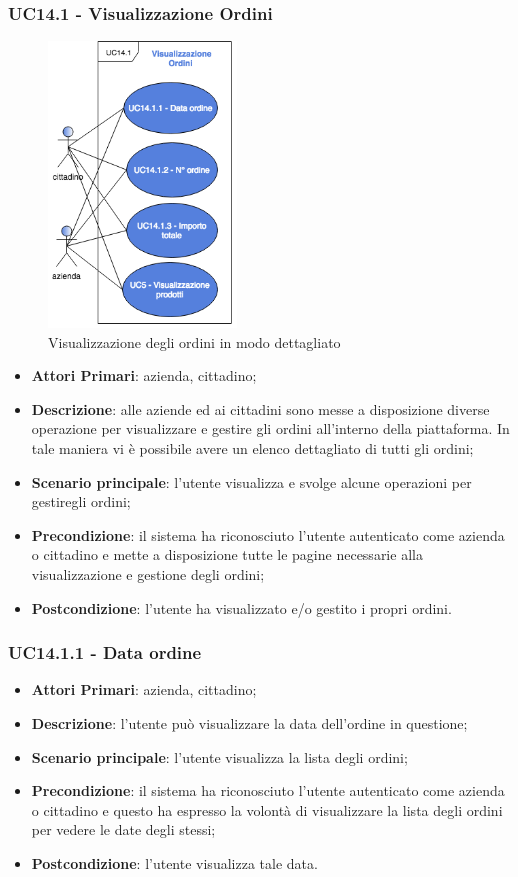 \subsubsection{UC14.1 - Visualizzazione Ordini}
\begin{figure}[H]
	\includegraphics[width=5cm]{res/images/UC14-1VisualOrdini.png}
	\centering
	\caption{Visualizzazione degli ordini in modo dettagliato}
\end{figure}
\begin{itemize}
	\item \textbf{Attori Primari}: azienda, cittadino;
	\item \textbf{Descrizione}: alle aziende ed ai cittadini sono messe a disposizione diverse operazione per visualizzare e gestire gli ordini all'interno della piattaforma. In tale maniera vi è possibile avere un elenco dettagliato di tutti gli ordini;
	\item \textbf{Scenario principale}: l'utente visualizza e svolge alcune operazioni per gestiregli ordini;
	\item \textbf{Precondizione}: il sistema ha riconosciuto l'utente autenticato come azienda o cittadino e mette a disposizione tutte le pagine necessarie alla visualizzazione e gestione degli ordini;
	\item \textbf{Postcondizione}: l'utente ha visualizzato e/o gestito i propri ordini.
\end{itemize} 

\subsubsection{UC14.1.1 - Data ordine}
\begin{itemize}
	\item \textbf{Attori Primari}: azienda, cittadino;
	\item \textbf{Descrizione}: l'utente può visualizzare la data dell'ordine in questione;
	\item \textbf{Scenario principale}: l'utente visualizza la lista degli ordini;
	\item \textbf{Precondizione}: il sistema ha riconosciuto l'utente autenticato come azienda o cittadino e questo ha espresso la volontà di visualizzare la lista degli ordini per vedere le date degli stessi;
	\item \textbf{Postcondizione}: l'utente visualizza tale data.
\end{itemize}

